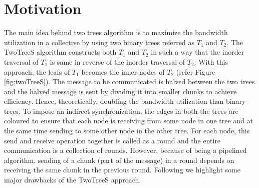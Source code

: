 \documentclass[sigplan,review,anonymous]{acmart}\settopmatter{printfolios=true,printccs=false,printacmref=false}
\begin{document}






\section{Motivation}\label{sec:Motivation}
The main idea behind two trees algorithm is to maximize the bandwidth utilization in a collective by using two binary trees referred as $T_1$ and $T_2$. The TwoTreeS algorithm constructs both $T_1$ and $T_2$ in such a way that the inorder traversal of $T_1$ is same in reverse of the inorder traversal of $T_2$. With this approach, the leafs of $T_1$ becomes the inner nodes of $T_2$ (refer Figure \ref{fig:twoTreeS}). The message to be communicated is halved between the two trees and the halved message is sent by dividing it into smaller chunks to achieve efficiency. Hence, theoretically, doubling the bandwidth utilization than binary trees. To impose an indirect synchronization, the edges in both the trees are coloured to ensure that each node is receiving from some node in one tree and at the same time sending to some other node in the other tree. For each node, this send and receive operation together is called as a round and the entire communication is a collection of rounds. However, because of being a pipelined algorithm, sending of a chunk (part of the message) in a round depends on receiving the same chunk in the previous round. Following we highlight some major drawbacks of the TwoTreeS approach.
\end{document}
